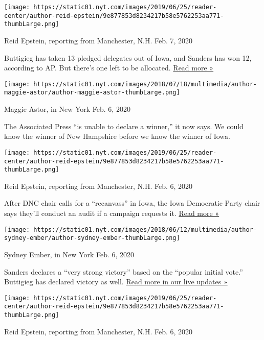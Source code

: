 \texttt{[image: https://static01.nyt.com/images/2019/06/25/reader-center/author-reid-epstein/9e877853d8234217b58e5762253aa771-thumbLarge.png]}

Reid Epstein, reporting from Manchester, N.H. Feb. 7, 2020

Buttigieg has taken 13 pledged delegates out of Iowa, and Sanders has
won 12, according to AP. But there's one left to be allocated.
\href{https://www.nytimes.com/2020/02/07/us/politics/iowa-pledged-delegates.html?action=click\&module=ELEX_results\&pgtype=Interactive\&region=ReporterUpdates}{Read
more »}

\texttt{[image: https://static01.nyt.com/images/2018/07/18/multimedia/author-maggie-astor/author-maggie-astor-thumbLarge.png]}

Maggie Astor, in New York Feb. 6, 2020

The Associated Press ``is unable to declare a winner,'' it now says. We
could know the winner of New Hampshire before we know the winner of
Iowa.

\texttt{[image: https://static01.nyt.com/images/2019/06/25/reader-center/author-reid-epstein/9e877853d8234217b58e5762253aa771-thumbLarge.png]}

Reid Epstein, reporting from Manchester, N.H. Feb. 6, 2020

After DNC chair calls for a ``recanvass'' in Iowa, the Iowa Democratic
Party chair says they'll conduct an audit if a campaign requests it.
\href{https://www.nytimes.com/live/2020/iowa-caucus-nh-primary-02-06?action=click\&module=ELEX_results\&pgtype=Interactive\&region=ReporterUpdates\#troy-price}{Read
more »}

\texttt{[image: https://static01.nyt.com/images/2018/06/12/multimedia/author-sydney-ember/author-sydney-ember-thumbLarge.png]}

Sydney Ember, in New York Feb. 6, 2020

Sanders declares a ``very strong victory'' based on the ``popular
initial vote.'' Buttigieg has declared victory as well.
\href{https://www.nytimes.com/live/2020/iowa-caucus-nh-primary-02-06?action=click\&module=ELEX_results\&pgtype=Interactive\&region=ReporterUpdates\#sanders-declares-victory-in-iowa-caucuses}{Read
more in our live updates »}

\texttt{[image: https://static01.nyt.com/images/2019/06/25/reader-center/author-reid-epstein/9e877853d8234217b58e5762253aa771-thumbLarge.png]}

Reid Epstein, reporting from Manchester, N.H. Feb. 6, 2020

